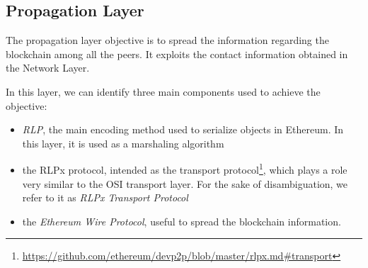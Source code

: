 \subsection{Propagation Layer}
\label{sec:propagation-layer}

The propagation layer objective is to spread the information regarding the
blockchain among all the peers. It exploits the contact information obtained
in the Network Layer.

In this layer, we can identify three main components used to achieve the
objective:
\begin{itemize}
  \item \emph{RLP}, the main encoding method used to serialize objects in Ethereum. In
  this layer, it is used as a marshaling algorithm
  \item the RLPx protocol, intended as the transport
  protocol\footnote{\url{https://github.com/ethereum/devp2p/blob/master/rlpx.md\#transport}},
  which plays a role very similar to the OSI transport layer. For the sake of
  disambiguation, we refer to it as \emph{RLPx Transport Protocol}
  \item the \emph{Ethereum Wire Protocol}, useful to spread the blockchain
  information.
\end{itemize}
